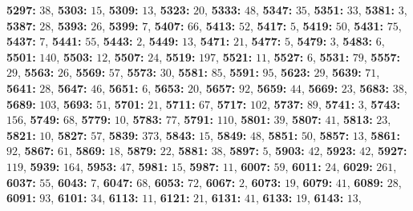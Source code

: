 \textsf{\bfseries 5297:} $38$, \textsf{\bfseries 5303:} $15$, \textsf{\bfseries 5309:} $13$, \textsf{\bfseries 5323:} $20$, \textsf{\bfseries 5333:} $48$, \textsf{\bfseries 5347:} $35$, \textsf{\bfseries 5351:} $33$, \textsf{\bfseries 5381:} $3$, \textsf{\bfseries 5387:} $28$, \textsf{\bfseries 5393:} $26$, \textsf{\bfseries 5399:} $7$, \textsf{\bfseries 5407:} $66$, \textsf{\bfseries 5413:} $52$, \textsf{\bfseries 5417:} $5$, \textsf{\bfseries 5419:} $50$, \textsf{\bfseries 5431:} $75$, \textsf{\bfseries 5437:} $7$, \textsf{\bfseries 5441:} $55$, \textsf{\bfseries 5443:} $2$, \textsf{\bfseries 5449:} $13$, \textsf{\bfseries 5471:} $21$, \textsf{\bfseries 5477:} $5$, \textsf{\bfseries 5479:} $3$, \textsf{\bfseries 5483:} $6$, \textsf{\bfseries 5501:} $140$, \textsf{\bfseries 5503:} $12$, \textsf{\bfseries 5507:} $24$, \textsf{\bfseries 5519:} $197$, \textsf{\bfseries 5521:} $11$, \textsf{\bfseries 5527:} $6$, \textsf{\bfseries 5531:} $79$, \textsf{\bfseries 5557:} $29$, \textsf{\bfseries 5563:} $26$, \textsf{\bfseries 5569:} $57$, \textsf{\bfseries 5573:} $30$, \textsf{\bfseries 5581:} $85$, \textsf{\bfseries 5591:} $95$, \textsf{\bfseries 5623:} $29$, \textsf{\bfseries 5639:} $71$, \textsf{\bfseries 5641:} $28$, \textsf{\bfseries 5647:} $46$, \textsf{\bfseries 5651:} $6$, \textsf{\bfseries 5653:} $20$, \textsf{\bfseries 5657:} $92$, \textsf{\bfseries 5659:} $44$, \textsf{\bfseries 5669:} $23$, \textsf{\bfseries 5683:} $38$, \textsf{\bfseries 5689:} $103$, \textsf{\bfseries 5693:} $51$, \textsf{\bfseries 5701:} $21$, \textsf{\bfseries 5711:} $67$, \textsf{\bfseries 5717:} $102$, \textsf{\bfseries 5737:} $89$, \textsf{\bfseries 5741:} $3$, \textsf{\bfseries 5743:} $156$, \textsf{\bfseries 5749:} $68$, \textsf{\bfseries 5779:} $10$, \textsf{\bfseries 5783:} $77$, \textsf{\bfseries 5791:} $110$, \textsf{\bfseries 5801:} $39$, \textsf{\bfseries 5807:} $41$, \textsf{\bfseries 5813:} $23$, \textsf{\bfseries 5821:} $10$, \textsf{\bfseries 5827:} $57$, \textsf{\bfseries 5839:} $373$, \textsf{\bfseries 5843:} $15$, \textsf{\bfseries 5849:} $48$, \textsf{\bfseries 5851:} $50$, \textsf{\bfseries 5857:} $13$, \textsf{\bfseries 5861:} $92$, \textsf{\bfseries 5867:} $61$, \textsf{\bfseries 5869:} $18$, \textsf{\bfseries 5879:} $22$, \textsf{\bfseries 5881:} $38$, \textsf{\bfseries 5897:} $5$, \textsf{\bfseries 5903:} $42$, \textsf{\bfseries 5923:} $42$, \textsf{\bfseries 5927:} $119$, \textsf{\bfseries 5939:} $164$, \textsf{\bfseries 5953:} $47$, \textsf{\bfseries 5981:} $15$, \textsf{\bfseries 5987:} $11$, \textsf{\bfseries 6007:} $59$, \textsf{\bfseries 6011:} $24$, \textsf{\bfseries 6029:} $261$, \textsf{\bfseries 6037:} $55$, \textsf{\bfseries 6043:} $7$, \textsf{\bfseries 6047:} $68$, \textsf{\bfseries 6053:} $72$, \textsf{\bfseries 6067:} $2$, \textsf{\bfseries 6073:} $19$, \textsf{\bfseries 6079:} $41$, \textsf{\bfseries 6089:} $28$, \textsf{\bfseries 6091:} $93$, \textsf{\bfseries 6101:} $34$, \textsf{\bfseries 6113:} $11$, \textsf{\bfseries 6121:} $21$, \textsf{\bfseries 6131:} $41$, \textsf{\bfseries 6133:} $19$, \textsf{\bfseries 6143:} $13$, 
